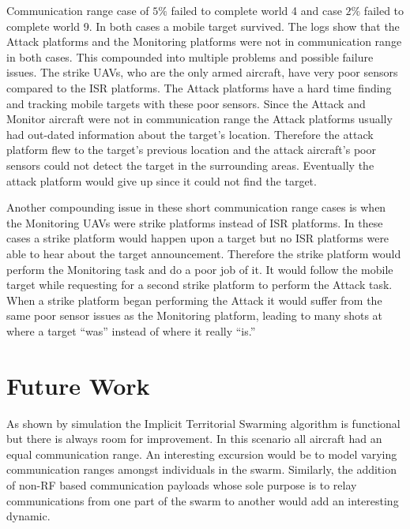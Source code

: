 \begin{multicols*}{2}
Communication range case of $5\%$ failed to complete world 4 and case $2\%$ failed to complete world 9.  In both cases a mobile target survived.  The logs show that the Attack platforms and the Monitoring platforms were not in communication range in both cases.  This compounded into multiple problems and possible failure issues.  The strike UAVs, who are the only armed aircraft, have very poor sensors compared to the ISR platforms.  The Attack platforms have a hard time finding and tracking mobile targets with these poor sensors.  Since the Attack and Monitor aircraft were not in communication range the Attack platforms usually had out-dated information about the target's location.  Therefore the attack platform flew to the target's previous location and the attack aircraft's poor sensors could not detect the target in the surrounding areas.  Eventually the attack platform would give up since it could not find the target.

Another compounding issue in these short communication range cases is when the Monitoring UAVs were strike platforms instead of ISR platforms.  In these cases a strike platform would happen upon a target but no ISR platforms were able to hear about the target announcement.  Therefore the strike platform would perform the Monitoring task and do a poor job of it.  It would follow the mobile target while requesting for a second strike platform to perform the Attack task.  When a strike platform began performing the Attack it would suffer from the same poor sensor issues as the Monitoring platform, leading to many shots at where a target ``was'' instead of where it really ``is.''


\section{Future Work}
As shown by simulation the Implicit Territorial Swarming algorithm is functional but there is always room for improvement.  In this scenario all aircraft had an equal communication range.  An interesting excursion would be to model varying communication ranges amongst individuals in the swarm.  Similarly, the addition of non-RF based communication payloads whose sole purpose is to relay communications from one part of the swarm to another would add an interesting dynamic.


\end{multicols*}
